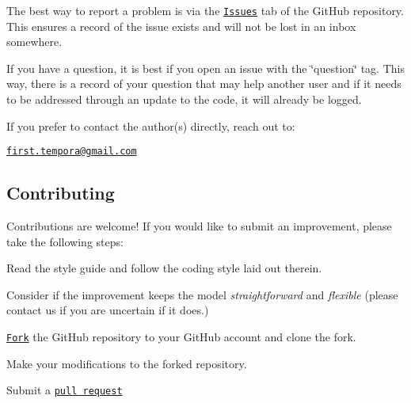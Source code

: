 The best way to report a problem is via the \href{https://github.com/firsttempora/PECANS/issues}{\tt Issues} tab of the Git\+Hub repository. This ensures a record of the issue exists and will not be lost in an inbox somewhere.

If you have a question, it is best if you open an issue with the \char`\"{}question\char`\"{} tag. This way, there is a record of your question that may help another user and if it needs to be addressed through an update to the code, it will already be logged.

If you prefer to contact the author(s) directly, reach out to\+:

\href{mailto:first.tempora@gmail.com}{\tt first.\+tempora@gmail.\+com}

\subsection*{Contributing}

Contributions are welcome! If you would like to submit an improvement, please take the following steps\+:


\begin{DoxyEnumerate}
\item Read the style guide and follow the coding style laid out therein.
\item Consider if the improvement keeps the model {\itshape straightforward} and {\itshape flexible} (please contact us if you are uncertain if it does.)
\item \href{https://help.github.com/articles/fork-a-repo/}{\tt Fork} the Git\+Hub repository to your Git\+Hub account and clone the fork.
\item Make your modifications to the forked repository.
\item Submit a \href{https://help.github.com/articles/about-pull-requests/}{\tt pull request} 
\end{DoxyEnumerate}
